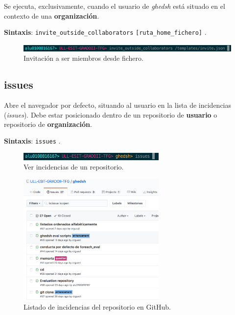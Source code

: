 Se ejecuta, exclusivamente, cuando el usuario de {\it ghedsh} está situado en el contexto de una \textbf{organización}.

\textbf{Sintaxis}: \verb|invite_outside_collaborators| \verb|[ruta_home_fichero]| .

\begin{figure}[H]
	\begin{center}
	\includegraphics[width=1\textwidth]{images/invite-collabs.png}
	\caption{Invitación a ser miembros desde fichero.}
	\label{fig:invite-collabs}
	\end{center}
\end{figure}

\subsection{issues}
\label{3.3.9}
Abre el navegador por defecto, situando al usuario en la lista de incidencias ({\it issues}). Debe estar posicionado dentro de un repositorio de \textbf{usuario} o repositorio de \textbf{organización}.

\textbf{Sintaxis}: \verb|issues| .

\begin{figure}[H]
	\begin{center}
	\includegraphics[width=0.65\textwidth]{images/list-issues.png}
	\caption{Ver incidencias de un repositorio.}
	\label{fig:list-issues}
	\end{center}
\end{figure}

\begin{figure}[H]
	\begin{center}
	\includegraphics[width=0.65\textwidth]{images/issues-list.png}
	\caption{Listado de incidencias del repositorio en GitHub.}
	\label{fig:issues-list}
	\end{center}
\end{figure}

